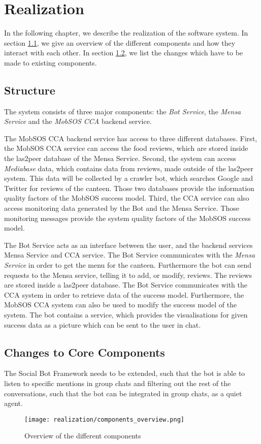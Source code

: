 \chapter{Realization}

In the following chapter, we describe the realization of the software system. In section \ref{sec:structure}, we give an overview of the different components and how they interact with each other. In section \ref{sec:changes}, we list the changes which have to be made to existing components.

\section{Structure}\label{sec:structure}

The system consists of three major components: the \emph{Bot Service}, the \emph{Mensa Service} and the \emph{MobSOS CCA} backend service.

The MobSOS CCA backend service has access to three different databases. First, the MobSOS CCA service can access the food reviews, which are stored inside the las2peer database of the Mensa Service. Second, the system can access \emph{Mediabase} data, which contains data from reviews, made outside of the las2peer system. This data will be collected by a crawler bot, which searches Google and Twitter for reviews of the canteen. Those two databases provide the information quality factors of the MobSOS success model.
Third, the CCA service can also access monitoring data generated by the Bot and the Mensa Service. Those monitoring messages provide the system quality factors of the MobSOS success model.

The Bot Service acts as an interface between the user, and the backend services Mensa Service and CCA service.
The Bot Service communicates with the \emph{Mensa Service} in order to get the menu for the canteen. Furthermore the bot can send requests to the Mensa service, telling it to add, or modify, reviews. The reviews are stored inside a las2peer database.
The Bot Service communicates with the CCA system in order to retrieve data of the success model. Furthermore, the MobSOS CCA system can also be used to modify the success model of the system. The bot contains a service, which provides the visualisations for given success data as a picture which can be sent to the user in chat.

\section{Changes to Core Components} \label{sec:changes}

The Social Bot Framework needs to be extended, such that the bot is able to listen to specific mentions in group chats and filtering out the rest of the conversations, such that the bot can be integrated in group chats, as a quiet agent.

\begin{figure}[h]
    \centering
    \texttt{[image: realization/components\_overview.png]}
    \caption{Overview of the different components}
    \label{fig:componentsOverview}
\end{figure}